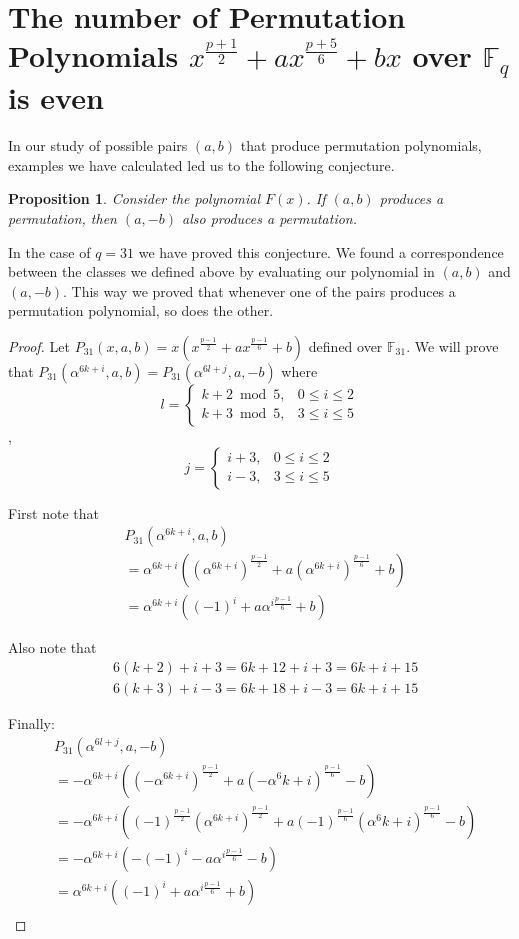 \documentclass[12pt]{article}
\newtheorem{proposition}{Proposition}
\begin{document}
\section{The number of Permutation Polynomials $x^{\frac{p+1}{2}} + ax^{\frac{p+5}{6}} + bx$ over $\mathbb{F}_{q}$ is even}\label{divby2}


In our study of possible pairs $(a,b)$ that produce permutation polynomials, examples we have calculated led us to the following conjecture.
\begin{proposition}
	Consider the polynomial $F(x)$. If $(a,b)$ produces a permutation, then $(a,-b)$ also produces a permutation.
\end{proposition}

In the case of $q=31$ we have proved this conjecture. We found a correspondence between the classes we defined above by evaluating our polynomial in $(a,b)$ and $(a,-b)$. This way we proved that whenever one of the pairs produces a permutation polynomial, so does the other.


\begin{proof}
	Let $P_{31}(x,a,b) = x(x^{\frac{p-1}{2}}+ax^{\frac{p-1}{6}}+b)$ defined over $\mathbb{F}_{31}$. We will prove that $P_{31}(\alpha^{6k+i},a,b) = P_{31}(\alpha^{6l+j},a,-b)$ where
	$$
	l =
	\begin{cases}
	k+2 \bmod{5}, & 0 \leq i \leq 2 \\
	k+3 \bmod{5}, & 3 \leq i \leq 5
	\end{cases}
	$$
	,
	$$
	j =
	\begin{cases}
	i+3, & 0 \leq i \leq 2 \\
	i-3, & 3 \leq i \leq 5
	\end{cases}
	$$
	
	First note that
	\begin{align*}
	&P_{31}(\alpha^{6k+i},a,b) \\
	&=\alpha^{6k+i}((\alpha^{6k+i})^{\frac{p-1}{2}}+a(\alpha^{6k+i})^{\frac{p-1}{6}}+b) \\
	&=\alpha^{6k+i}((-1)^{i}+a\alpha^{i\frac{p-1}{6}}+b)
	\end{align*}

	Also note that
	\begin{align*}
	&6(k+2)+i+3=6k+12+i+3=6k+i+15 \\
	&6(k+3)+i-3=6k+18+i-3=6k+i+15
	\end{align*}

	Finally:
	\begin{align*}
	&P_{31}(\alpha^{6l+j},a,-b)	\\
	&= -\alpha^{6k+i}((-\alpha^{6k+i})^\frac{p-1}{2}+a(-\alpha^6k+i)^\frac{p-1}{6}-b) \\
	&= -\alpha^{6k+i}((-1)^{\frac{p-1}{2}}(\alpha^{6k+i})^\frac{p-1}{2}+a(-1)^{\frac{p-1}{6}}(\alpha^6k+i)^\frac{p-1}{6}-b) \\
	&= -\alpha^{6k+i}(-(-1)^{i}-a\alpha^{i\frac{p-1}{6}}-b) \\
	&= \alpha^{6k+i}((-1)^{i}+a\alpha^{i\frac{p-1}{6}}+b) \\
	\end{align*}
	
\end{proof}
\end{document}
